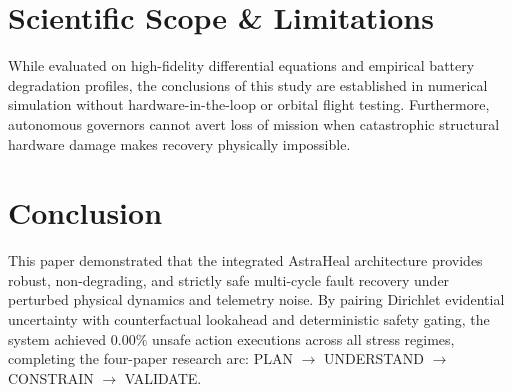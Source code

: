 \documentclass[conference]{IEEEtran}
\begin{document}
\section{Scientific Scope \& Limitations}

While evaluated on high-fidelity differential equations and empirical battery degradation profiles, the conclusions of this study are established in numerical simulation without hardware-in-the-loop or orbital flight testing. Furthermore, autonomous governors cannot avert loss of mission when catastrophic structural hardware damage makes recovery physically impossible.

\section{Conclusion}

This paper demonstrated that the integrated AstraHeal architecture provides robust, non-degrading, and strictly safe multi-cycle fault recovery under perturbed physical dynamics and telemetry noise. By pairing Dirichlet evidential uncertainty with counterfactual lookahead and deterministic safety gating, the system achieved $0.00\%$ unsafe action executions across all stress regimes, completing the four-paper research arc: PLAN $\rightarrow$ UNDERSTAND $\rightarrow$ CONSTRAIN $\rightarrow$ VALIDATE.

\balance


\end{document}
